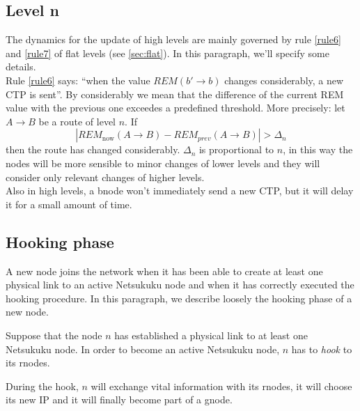 \documentclass[a4paper]{article}
\begin{document}
\subsection{Level n}
\label{sec:netdyn-leveln}
The dynamics for the update of high levels are mainly governed by rule
\ref{rule6} and \ref{rule7} of flat levels (see \ref{sec:flat}). In this
paragraph, we'll specify some details.\\
\newline
Rule \ref{rule6} says: ``when the value $REM(b'\rightarrow b)$ changes
considerably, a new CTP is sent''.
By considerably we mean that the difference of the current REM value with the
previous one exceedes a predefined threshold. More precisely: let
$A\rightarrow B$ be a route of level $n$. If \[|REM_{\textrm{now}}(A\rightarrow B)-
REM_{prev}(A\rightarrow B)| > \Delta_n\]
then the route has changed considerably. $\Delta_n$ is proportional to $n$, in this way the nodes will be
more sensible to minor changes of lower levels and they will consider only
relevant changes of higher levels.\\
\newline
Also in high levels, a bnode won't immediately send a new CTP, but it
will delay it for a small amount of time.

\subsection{Hooking phase}
A new node joins the network when it has been able to create at least one
physical link to an active Netsukuku node and when it has correctly executed
the hooking procedure. In this paragraph, we describe loosely the hooking
phase of a new node.

Suppose that the node $n$ has established a physical link to at least one Netsukuku
node. In order to become an active Netsukuku node, $n$ has to \emph{hook} to
its rnodes.

During the hook, $n$ will exchange vital information with its rnodes,
it will choose its new IP and it will finally become part of a gnode.
\end{document}
